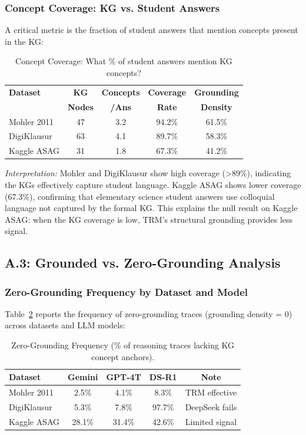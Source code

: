 \documentclass[journal,review]{vgtc}
\begin{document}
\subsubsection{Concept Coverage: KG vs. Student Answers}

A critical metric is the fraction of student answers that mention concepts present in the KG:

\begin{table}[ht]
\centering
\caption{Concept Coverage: What \% of student answers mention KG concepts?}
\label{tab:kg_coverage}
\begin{tabular}{lcccc}
\toprule
\textbf{Dataset} & \textbf{KG} & \textbf{Concepts} & \textbf{Coverage} & \textbf{Grounding} \\
\textbf{} & \textbf{Nodes} & \textbf{/Ans} & \textbf{Rate} & \textbf{Density} \\
\midrule
Mohler 2011 & 47 & 3.2 & 94.2\% & 61.5\% \\
DigiKlausur & 63 & 4.1 & 89.7\% & 58.3\% \\
Kaggle ASAG & 31 & 1.8 & 67.3\% & 41.2\% \\
\bottomrule
\end{tabular}
\end{table}

\textit{Interpretation:} Mohler and DigiKlausur show high coverage (>89\%), indicating the KGs effectively capture student language. Kaggle ASAG shows lower coverage (67.3\%), confirming that elementary science student answers use colloquial language not captured by the formal KG. This explains the null result on Kaggle ASAG: when the KG coverage is low, TRM's structural grounding provides less signal.

\subsection{A.3: Grounded vs. Zero-Grounding Analysis}

\subsubsection{Zero-Grounding Frequency by Dataset and Model}

Table~\ref{tab:zero_grounding} reports the frequency of zero-grounding traces (grounding density = 0) across datasets and LLM models:

\begin{table}[ht]
\centering
\caption{Zero-Grounding Frequency (\% of reasoning traces lacking KG concept anchors).}
\label{tab:zero_grounding}
\small
\begin{tabular}{lcccc}
\toprule
\textbf{Dataset} & \textbf{Gemini} & \textbf{GPT-4T} & \textbf{DS-R1} & \textbf{Note} \\
\midrule
Mohler 2011 & 2.5\% & 4.1\% & 8.3\% & TRM effective \\
DigiKlausur & 5.3\% & 7.8\% & 97.7\% & DeepSeek fails \\
Kaggle ASAG & 28.1\% & 31.4\% & 42.6\% & Limited signal \\
\bottomrule
\end{tabular}
\end{table}
\end{document}
